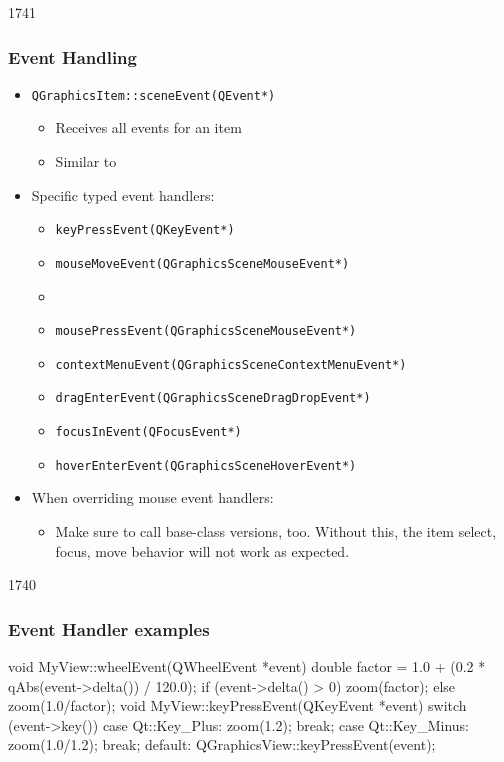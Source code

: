\begin{slide}{1741}

\frametitle{Event Handling}
\begin{itemize}
\item \texttt{QGraphicsItem::sceneEvent(QEvent*)}
    \begin{itemize}
    \item Receives all events for an item
    \item Similar to 

    \end{itemize}
\item Specific typed event handlers:
    \begin{itemize}
    \item \texttt{keyPressEvent(QKeyEvent*)}
    \item \texttt{mouseMoveEvent(QGraphicsSceneMouseEvent*)}
    \item {}
    \item \texttt{mousePressEvent(QGraphicsSceneMouseEvent*)}
    \item \texttt{contextMenuEvent(QGraphicsSceneContextMenuEvent*)}
    \item \texttt{dragEnterEvent(QGraphicsSceneDragDropEvent*)}
    \item \texttt{focusInEvent(QFocusEvent*)}
    \item \texttt{hoverEnterEvent(QGraphicsSceneHoverEvent*)}
    \end{itemize}

\item When overriding mouse event handlers:
  \begin{itemize}
     \item Make sure to call base-class versions, too. Without this, the item select, focus, move behavior will not work as expected.
   \end{itemize}
\end{itemize}
\end{slide}


\begin{slide}[fragile]{1740}


\frametitle{Event Handler examples}
\begin{cpp}
void MyView::wheelEvent(QWheelEvent *event) {
    double factor =
        1.0 + (0.2 * qAbs(event->delta()) / 120.0);
    if (event->delta() > 0) zoom(factor);
    else                    zoom(1.0/factor);
}
void MyView::keyPressEvent(QKeyEvent *event) {
    switch (event->key()) {
      case Qt::Key_Plus:
          zoom(1.2);
          break;
      case Qt::Key_Minus:
          zoom(1.0/1.2);
          break;
      default:
          QGraphicsView::keyPressEvent(event);
    }
}
\end{cpp}

\end{slide}


